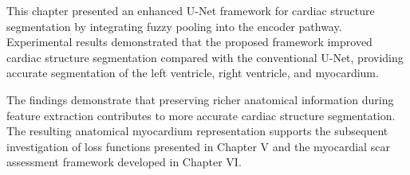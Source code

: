 This chapter presented an enhanced U-Net framework for cardiac structure segmentation by integrating fuzzy pooling into the encoder pathway. Experimental results demonstrated that the proposed framework improved cardiac structure segmentation compared with the conventional U-Net, providing accurate segmentation of the left ventricle, right ventricle, and myocardium.

The findings demonstrate that preserving richer anatomical information during feature extraction contributes to more accurate cardiac structure segmentation. The resulting anatomical myocardium representation supports the subsequent investigation of loss functions presented in Chapter V and the myocardial scar assessment framework developed in Chapter VI.
